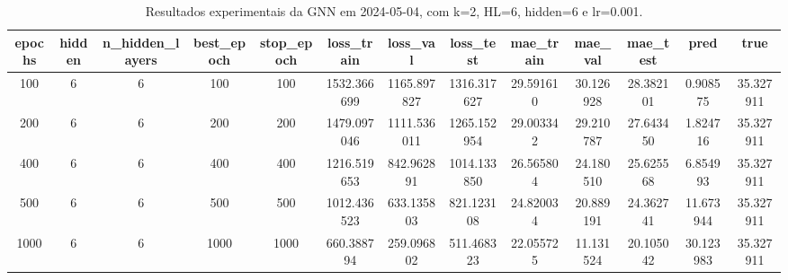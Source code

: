 \begin{table}[h]
\centering
\caption{Resultados experimentais da GNN em 2024-05-04, com k=2, HL=6, hidden=6 e lr=0.001.}
\label{tab:gnn_results_k2_hl6_h6_d20240504}
\begin{tabular}{ccccccccccccc}
\toprule
epochs & hidden & n\_hidden\_layers & best\_epoch & stop\_epoch & loss\_train & loss\_val & loss\_test & mae\_train & mae\_val & mae\_test & pred & true \\
\midrule
100 & 6 & 6 & 100 & 100 & 1532.366699 & 1165.897827 & 1316.317627 & 29.591610 & 30.126928 & 28.382101 & 0.908575 & 35.327911 \\
200 & 6 & 6 & 200 & 200 & 1479.097046 & 1111.536011 & 1265.152954 & 29.003342 & 29.210787 & 27.643450 & 1.824716 & 35.327911 \\
400 & 6 & 6 & 400 & 400 & 1216.519653 & 842.962891 & 1014.133850 & 26.565804 & 24.180510 & 25.625568 & 6.854993 & 35.327911 \\
500 & 6 & 6 & 500 & 500 & 1012.436523 & 633.135803 & 821.123108 & 24.820034 & 20.889191 & 24.362741 & 11.673944 & 35.327911 \\
1000 & 6 & 6 & 1000 & 1000 & 660.388794 & 259.096802 & 511.468323 & 22.055725 & 11.131524 & 20.105042 & 30.123983 & 35.327911 \\
\bottomrule
\end{tabular}
\end{table}
